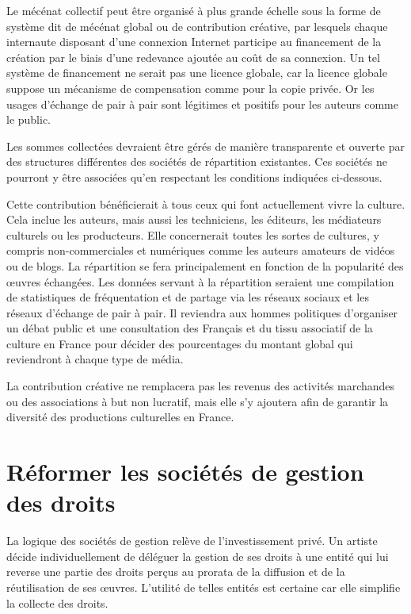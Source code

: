 Le mécénat collectif peut être organisé à plus grande échelle sous la forme de système dit de mécénat global ou de contribution créative, par lesquels chaque internaute disposant d'une connexion Internet participe au financement de la création par le biais d'une redevance ajoutée au coût de sa connexion. Un tel système de financement ne serait pas une licence globale, car la licence globale suppose un mécanisme de compensation comme pour la copie privée. Or les usages d'échange de pair à pair sont légitimes et positifs pour les auteurs comme le public.

Les sommes collectées devraient être gérés de manière transparente et ouverte par des structures différentes des sociétés de répartition existantes. Ces sociétés ne pourront y être associées qu'en respectant les conditions indiquées ci-dessous. 

Cette contribution bénéficierait à tous ceux qui font actuellement vivre la culture. Cela inclue les auteurs, mais aussi les techniciens, les éditeurs, les médiateurs culturels ou les producteurs. Elle concernerait toutes les sortes de cultures, y compris non-commerciales et numériques comme les auteurs amateurs de vidéos ou de blogs. La répartition se fera principalement en fonction de la popularité des œuvres échangées. Les données servant à la répartition seraient une compilation de statistiques de fréquentation et de partage via les réseaux sociaux et les réseaux d'échange de pair à pair. Il reviendra aux hommes politiques d'organiser un débat public et une consultation des Français et du tissu associatif de la culture en France pour décider des pourcentages du montant global qui reviendront à chaque type de média. 

La contribution créative ne remplacera pas les revenus des activités marchandes ou des associations à but non lucratif, mais elle s'y ajoutera afin de garantir la diversité des productions culturelles en France.

\section{Réformer les sociétés de gestion des droits}

La logique des sociétés de gestion relève de l'investissement privé. Un artiste décide individuellement de déléguer la gestion de ses droits à une entité qui lui reverse une partie des droits perçus au prorata de la diffusion et de la réutilisation de ses œuvres. L'utilité de telles entités est certaine car elle simplifie la collecte des droits. 

